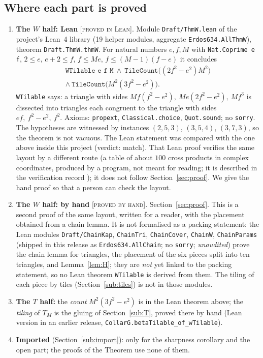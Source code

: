 \documentclass[11pt,reqno]{amsart}
\theoremstyle{plain}
\theoremstyle{definition}
\newcommand{\lab}[1]{\textup{[\textsc{#1}]}}
\newcommand{\PL}{\lab{proved in Lean}}
\newcommand{\PH}{\lab{proved by hand}}
\begin{document}
\subsection{Where each part is proved}
\begin{enumerate}\itemsep2pt
\item \textbf{The $W$ half: Lean} \PL. Module \texttt{Draft/ThmW.lean} of the project's Lean~4 library (19 helper modules, aggregate \texttt{Erdos634.AllThmW}), theorem \texttt{Draft.ThmW.thmW}. For natural numbers $e,f,M$ with \texttt{Nat.Coprime e f}, $2\le e$, $e+2\le f$, $f\le Me$, $f\le(M-1)(f-e)$ it concludes
\begin{gather*}\texttt{WTilable e f M}\ \wedge\ \texttt{TileCount}\bigl((2f^2-e^2)M^2\bigr)\\ \wedge\ \texttt{TileCount}\bigl(M^2(3f^2-e^2)\bigr).\end{gather*}
\texttt{WTilable} says: a triangle with sides $Mf(f^2-e^2),\ Me(2f^2-e^2),\ Mf^3$ is dissected into triangles each congruent to the triangle with sides $ef,\ f^2-e^2,\ f^2$. Axioms: \texttt{propext}, \texttt{Classical.choice}, \texttt{Quot.sound}; no \texttt{sorry}. The hypotheses are witnessed by instances $(2,5,3)$, $(3,5,4)$, $(3,7,3)$, so the theorem is not vacuous. The Lean statement was compared with the one above inside this project (verdict: match). That Lean proof verifies the same layout by a different route (a table of about $100$ cross products in complex coordinates, produced by a program, not meant for reading; it is described in the verification record \cite{Verif}); it does not follow Section~\ref{sec:proof}. We give the hand proof so that a person can check the layout.
\item \textbf{The $W$ half: by hand} \PH. Section~\ref{sec:proof}. This is a second proof of the same layout, written for a reader, with the placement obtained from a chain lemma. It is not formalised as a packing statement: the Lean modules \texttt{Draft/ChainKap}, \texttt{ChainTri}, \texttt{ChainCover}, \texttt{ChainW}, \texttt{ChainParams} (shipped in this release as \texttt{Erdos634.AllChain}; no \texttt{sorry}; \emph{unaudited}) prove the chain lemma for triangles, the placement of the six pieces split into ten triangles, and Lemma~\ref{lem:H}; they are \emph{not} yet linked to the packing statement, so no Lean theorem \texttt{WTilable} is derived from them. The tiling of each piece by tiles (Section~\ref{sub:tiles}) is not in those modules.
\item \textbf{The $T$ half:} the \emph{count} $M^2(3f^2-e^2)$ is in the Lean theorem above; the \emph{tiling} of $T_M$ is the gluing of Section~\ref{sub:T}, proved there by hand (Lean version in an earlier release, \texttt{CollarG.betaTilable\_of\_wTilable}).
\item \textbf{Imported} (Section~\ref{sub:import}): only for the sharpness corollary and the open part; the proofs of the Theorem use none of them.
\end{enumerate}
\end{document}
